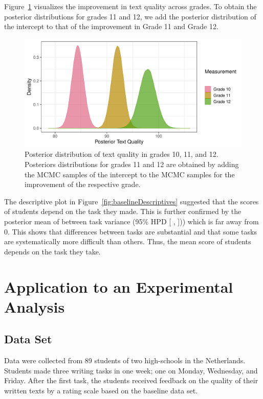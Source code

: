 \documentclass[a4paper]{article}
\newcommand{\getVal}[3]{%
	\pgfplotstablegetelem{#1}{#2}\of{#3}%
	\pgfmathprintnumber{\pgfplotsretval}%
}
\newcommand{\getCI}[2]{95\% HPD [\getVal{#1}{Lower}{#2}, \getVal{#1}{Upper}{#2}]}
\newcommand{\DON}	[1] 	{}
\begin{document}
Figure~\ref{fig:baselinePosteriorTextQuality} visualizes the improvement in text quality across grades. To obtain the posterior distributions for grades 11 and 12, we add the posterior distribution of the intercept to that of the improvement in Grade 11 and Grade 12.
\begin{figure}[!ht]
	\includegraphics[width=\textwidth]{posteriorTextQualityBaseline}
	\caption{Posterior distribution of text quality in grades 10, 11, and 12. Posteriors distributions for grades 11 and 12 are obtained by adding the MCMC samples of the intercept to the MCMC samples for the improvement of the respective grade.}
	\label{fig:baselinePosteriorTextQuality}
\end{figure}

The descriptive plot in Figure~\ref{fig:baselineDescriptives} suggested that the scores of students depend on the task they made. This is further confirmed by the posterior mean of between task variance \getVal{5}{Mean}{\tbPostSummaryBaseline} (\getCI{5}{\tbPostSummaryBaseline})) which is far away from 0. This shows that differences between tasks are substantial and that some tasks are systematically more difficult than others. Thus, the mean score of students depends on the task they take.

\section*{Application to an Experimental Analysis}

\subsection*{Data Set}
Data were collected from 89 students of two high-schools in the Netherlands. Students made three writing tasks in one week; one on Monday, Wednesday, and Friday. After the first task, the students received feedback on the quality of their written texts by a rating scale based on the baseline data set.
\DON{Aanvullen aub!}
\end{document}
